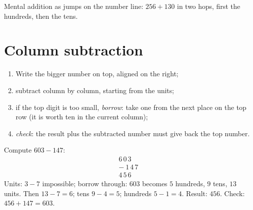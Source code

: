 \begin{omfigure}

{\small Mental addition as jumps on the number line: $256 + 130$ in
two hops, first the hundreds, then the tens.}
\end{omfigure}

\section{Column subtraction}

\begin{method}\label{met:g3:addsub:sub}
\begin{enumerate}
  \item Write the bigger number on top, aligned on the right;
  \item subtract column by column, starting from the units;
  \item if the top digit is too small, \emph{borrow}: take one from
        the next place on the top row (it is worth ten in the current
        column);
  \item \emph{check}: the result plus the subtracted number must give
        back the top number.
\end{enumerate}
\end{method}

\begin{example}\label{ex:g3:addsub:sub}
Compute $603 - 147$:
\[
\begin{array}{r}
6\,0\,3 \\
-\ 1\,4\,7 \\
\hline
4\,5\,6
\end{array}
\]
Units: $3 - 7$ impossible; borrow through: $603$ becomes
$5$ hundreds, $9$ tens, $13$ units. Then $13 - 7 = 6$;
tens $9 - 4 = 5$; hundreds $5 - 1 = 4$. Result: $456$.
Check: $456 + 147 = 603$.
\end{example}

